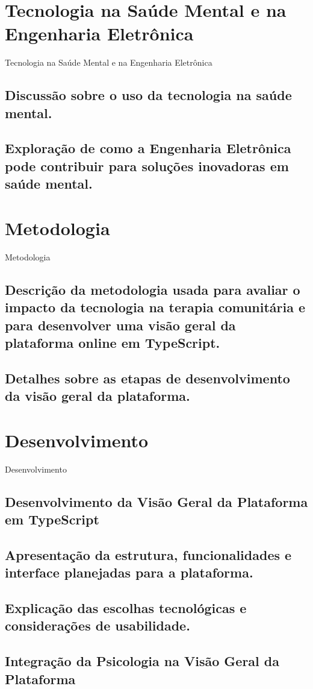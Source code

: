 \chapter{Tecnologia na Saúde Mental e na Engenharia Eletrônica}{Tecnologia na Saúde Mental e na Engenharia Eletrônica}
\section{Discussão sobre o uso da tecnologia na saúde mental.}
\section{Exploração de como a Engenharia Eletrônica pode contribuir para soluções inovadoras em saúde mental.}
\chapter{Metodologia}{Metodologia}
\section{Descrição da metodologia usada para avaliar o impacto da tecnologia na terapia comunitária e para desenvolver uma visão geral da plataforma online em TypeScript.}
\section{Detalhes sobre as etapas de desenvolvimento da visão geral da plataforma.}
\chapter{Desenvolvimento}{Desenvolvimento}
\section{Desenvolvimento da Visão Geral da Plataforma em TypeScript}
\section{Apresentação da estrutura, funcionalidades e interface planejadas para a plataforma.}
\section{Explicação das escolhas tecnológicas e considerações de usabilidade.}
\section{Integração da Psicologia na Visão Geral da Plataforma}
